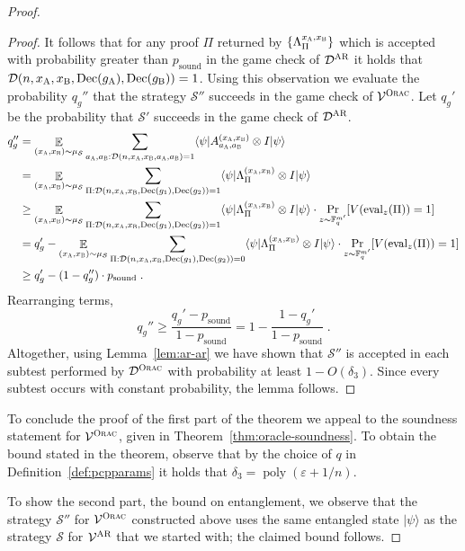 \documentclass[11pt]{article}
\theoremstyle{definition}
\newcommand{\ket}[1]{|#1\rangle}
\newcommand{\bra}[1]{\langle#1|}
\DeclareMathOperator*{\Expectation}{\mathbb{E}}
\newcommand{\Es}[1]{\Expectation_{#1}}
\newcommand{\F}{\ensuremath{\mathbb{F}}}
\newcommand{\ot}{\otimes}
\DeclareMathOperator{\poly}{poly}
\newcommand{\eps}{\varepsilon}
\newcommand{\sampler}{\mathcal{S}}
\newcommand{\decider}{\mathcal{D}}
\newcommand{\verifier}{\mathcal{V}}
\newcommand{\strategy}{\mathscr{S}}
\newcommand{\gamestyle}[1]{\ensuremath{\textsc{#1}}\xspace}
\newcommand{\ora}{\gamestyle{Orac}}
\newcommand{\ar}{\gamestyle{AR}}
\newcommand{\labelstyle}[1]{\ensuremath{\textsc{#1}}\xspace}
\newcommand{\alice}{\labelstyle{A}}
\newcommand{\bob}{\labelstyle{B}}
\newcommand{\eval}{\mathrm{eval}}
\newcommand{\coded}{\mathrm{Dec}}
\newcommand{\soundness}{\mathrm{sound}}
\begin{document}
\begin{proof}
\begin{proof}
  It follows that for any proof $\Pi$ returned by
  $\{\Lambda^{{x}_\alice,{x}_\bob}_\Pi\}$ which is accepted with probability
  greater than $p_{\soundness}$ in the game check of $\decider^\ar$ it holds
  that $\decider(n, {x}_\alice, {x}_\bob, \coded(g_\alice), \coded(g_\bob)) =
  1$.
  Using this observation we evaluate the probability $q_g''$ that the strategy
  $\strategy''$ succeeds in the game check of $\verifier^\ora$.
  Let $q_g'$ be the probability that $\strategy'$ succeeds in the game check of
  $\decider^\ar$.
  \begin{align*}
    q_g'' &= \Es{({x}_\alice,{x}_\bob) \sim \mu_{\sampler}} \sum_{a_\alice,
            a_\bob: \decider(n,{x}_\alice,{x}_\bob, a_\alice, a_\bob) = 1}
            \bra{\psi} A^{({x}_\alice,{x}_\bob)}_{a_\alice, a_\bob} \ot I
            \ket{\psi}    \\
          &= \Es{({x}_\alice,{x}_\bob) \sim \mu_{\sampler}} \sum_{\Pi
            : \decider(n,{x}_\alice,{x}_\bob, \coded(g_1), \coded(g_2)) = 1}
            \bra{\psi} \Lambda^{({x}_\alice,{x}_\bob)}_{\Pi} \ot I
            \ket{\psi} \\
          &\geq \Es{({x}_\alice,{x}_\bob) \sim \mu_{\sampler}} \sum_{\Pi
            : \decider(n,{x}_\alice,{x}_\bob, \coded(g_1), \coded(g_2)) = 1}
            \bra{\psi} \Lambda^{({x}_\alice,{x}_\bob)}_{\Pi} \ot I
            \ket{\psi} \cdot \Pr_{z \sim \F_q^{m'}} [
            V(\eval_z(\Pi)) = 1]\\
          &= q_g' -  \Es{({x}_\alice,{x}_\bob) \sim \mu_{\sampler}} \sum_{\Pi
            : \decider(n,{x}_\alice,{x}_\bob, \coded(g_1), \coded(g_2)) = 0}
            \bra{\psi} \Lambda^{({x}_\alice,{x}_\bob)}_{\Pi} \ot I
            \ket{\psi} \cdot \Pr_{z \sim \F_q^{m'}} [
            V(\eval_z(\Pi)) = 1] \\
          &\geq q_g' - ( 1- q_g'')\cdot
            p_{\soundness} \;.
  \end{align*}
  Rearranging terms,
  \begin{equation}
    q_g'' \geq \frac{q_g' - p_{\soundness}}{1 - p_{\soundness}} 
    = 1 - \frac{1-q_g'}{1 - p_{\soundness}}\;. \label{eq:pgameora}
  \end{equation}
  Altogether, using Lemma~\ref{lem:ar-ar} we have shown that $\strategy''$ is
  accepted in each subtest performed by $\decider^\ora$ with probability at
  least $1 - O(\delta_3)$.
  Since every subtest occurs with constant probability, the lemma follows.
  \end{proof}
	
	To conclude the proof of the first part of the theorem we appeal to the
  soundness statement for $\verifier^\ora$, given in
  Theorem~\ref{thm:oracle-soundness}.
  To obtain the bound stated in the theorem, observe that by the choice of $q$
  in Definition~\ref{def:pcpparams} it holds that $\delta_3 = \poly(\eps+1/n)$.

  To show the second part, the bound on entanglement, we observe that the
  strategy $\strategy''$ for $\verifier^\ora$ constructed above uses the same
  entangled state $\ket{\psi}$ as the strategy $\strategy$ for $\verifier^\ar$
  that we started with; the claimed bound follows.
\end{proof}
\end{document}
